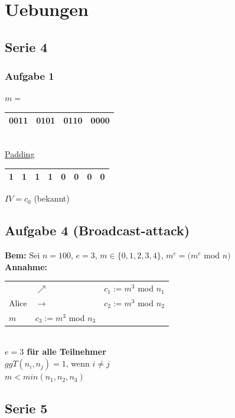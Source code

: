 \documentclass[10pt]{article}
\newcommand{\Bold}[1]{\textbf{#1}} %
\begin{document}
\pagebreak
\section{Uebungen}
\subsection*{Serie 4}
\subsubsection*{Aufgabe 1}
$m=$\begin{tabular}{|c|c|c|c|}\hline
 0011&0101&0110&0000\\\hline
\end{tabular}\\
\underline{Padding} 
\begin{tabular}{|c|c|c|c|c|c|c|c|}\hline
 1&1&1&1&0&0&0&0\\\hline
\end{tabular} $IV=c_0$ (bekannt)
\subsection*{Aufgabe 4 (Broadcast-attack)}
\Bold{Bem:} Sei $n=100$, $e=3$, $m\in\{0,1,2,3,4\}$, $m^e=(m^e$ mod $n)$\\
\Bold{Annahme:} 
\begin{tabular}{lll}
 &$\nearrow$&$c_1:=m^3$ mod $n_1$\\
 Alice&$\to$&$c_2:=m^3$ mod $n_2$\\
 $m$&$c_3:=m^3$ mod $n_3$
\end{tabular}\\
\Bold{$e=3$ für alle Teilnehmer}\\
$ggT(n_i,n_j)=1$, wenn $i\neq j$\\
$m<min(n_1,n_2,n_3)$

\subsection*{Serie 5}
\end{document}
